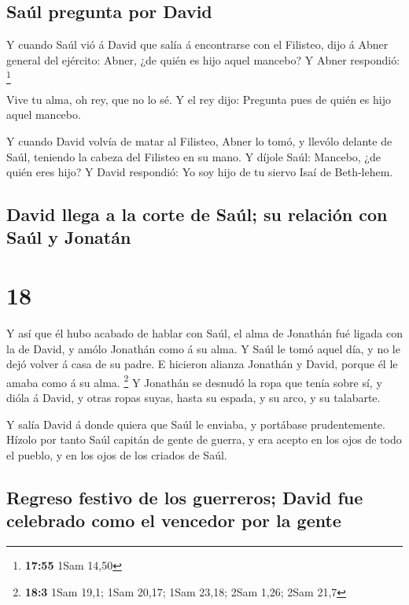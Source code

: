 \hypertarget{sauxfal-pregunta-por-david}{%
\subsection{Saúl pregunta por David}\label{sauxfal-pregunta-por-david}}

 Y cuando Saúl vió á David que salía á encontrarse con el
Filisteo, dijo á Abner general del ejército: Abner, ¿de quién es hijo
aquel mancebo? Y Abner respondió: \footnote{\textbf{17:55} 1Sam 14,50}

 Vive tu alma, oh rey, que no lo sé. Y el rey dijo:
Pregunta pues de quién es hijo aquel mancebo.

 Y cuando David volvía de matar al Filisteo, Abner lo tomó,
y llevólo delante de Saúl, teniendo la cabeza del Filisteo en su mano.
 Y díjole Saúl: Mancebo, ¿de quién eres hijo? Y David
respondió: Yo soy hijo de tu siervo Isaí de Beth-lehem.

\hypertarget{david-llega-a-la-corte-de-sauxfal-su-relaciuxf3n-con-sauxfal-y-jonatuxe1n}{%
\subsection{David llega a la corte de Saúl; su relación con Saúl y
Jonatán}\label{david-llega-a-la-corte-de-sauxfal-su-relaciuxf3n-con-sauxfal-y-jonatuxe1n}}

\hypertarget{section-17}{%
\section{18}\label{section-17}}

 Y así que él hubo acabado de hablar con Saúl, el alma de
Jonathán fué ligada con la de David, y amólo Jonathán como á su alma.
 Y Saúl le tomó aquel día, y no le dejó volver á casa de su
padre.  E hicieron alianza Jonathán y David, porque él le
amaba como á su alma. \footnote{\textbf{18:3} 1Sam 19,1; 1Sam 20,17;
  1Sam 23,18; 2Sam 1,26; 2Sam 21,7}  Y Jonathán se desnudó
la ropa que tenía sobre sí, y dióla á David, y otras ropas suyas, hasta
su espada, y su arco, y su talabarte.

 Y salía David á donde quiera que Saúl le enviaba, y
portábase prudentemente. Hízolo por tanto Saúl capitán de gente de
guerra, y era acepto en los ojos de todo el pueblo, y en los ojos de los
criados de Saúl.

\hypertarget{regreso-festivo-de-los-guerreros-david-fue-celebrado-como-el-vencedor-por-la-gente}{%
\subsection{Regreso festivo de los guerreros; David fue celebrado como
el vencedor por la
gente}\label{regreso-festivo-de-los-guerreros-david-fue-celebrado-como-el-vencedor-por-la-gente}}


